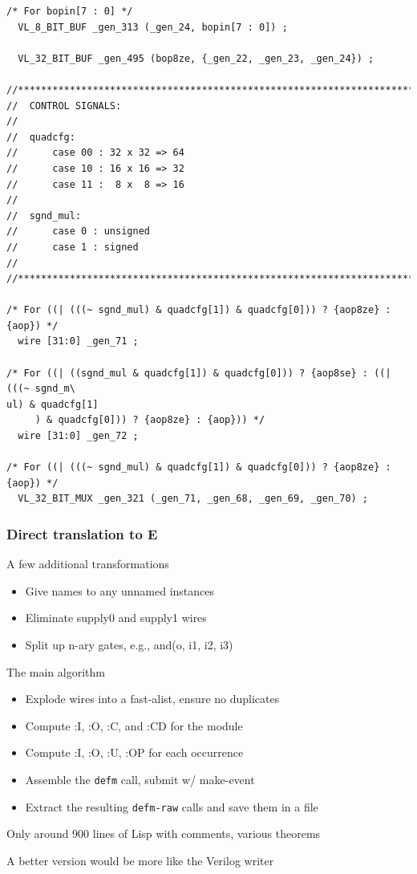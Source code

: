 \documentclass[mathserif]{beamer}
\begin{document}
\begin{frame}[fragile]

{\tiny
\begin{verbatim}
/* For bopin[7 : 0] */
  VL_8_BIT_BUF _gen_313 (_gen_24, bopin[7 : 0]) ;

  VL_32_BIT_BUF _gen_495 (bop8ze, {_gen_22, _gen_23, _gen_24}) ;

//************************************************************************
//  CONTROL SIGNALS:
//
//  quadcfg:
//      case 00 : 32 x 32 => 64
//      case 10 : 16 x 16 => 32
//      case 11 :  8 x  8 => 16
//
//  sgnd_mul:
//      case 0 : unsigned
//      case 1 : signed
//
//************************************************************************

/* For ((| (((~ sgnd_mul) & quadcfg[1]) & quadcfg[0])) ? {aop8ze} : {aop}) */
  wire [31:0] _gen_71 ;

/* For ((| ((sgnd_mul & quadcfg[1]) & quadcfg[0])) ? {aop8se} : ((| (((~ sgnd_m\
ul) & quadcfg[1]
     ) & quadcfg[0])) ? {aop8ze} : {aop})) */
  wire [31:0] _gen_72 ;

/* For ((| (((~ sgnd_mul) & quadcfg[1]) & quadcfg[0])) ? {aop8ze} : {aop}) */
  VL_32_BIT_MUX _gen_321 (_gen_71, _gen_68, _gen_69, _gen_70) ;

\end{verbatim}
}
\end{frame}


\begin{frame}
\frametitle{Direct translation to E}

A few additional transformations
\begin{itemize}
\item Give names to any unnamed instances
\item Eliminate supply0 and supply1 wires
\item Split up n-ary gates, e.g., and(o, i1, i2, i3)
\end{itemize}

\bigskip
The main algorithm
\begin{itemize}
\item Explode wires into a fast-alist, ensure no duplicates
\item Compute :I, :O, :C, and :CD for the module
\item Compute :I, :O, :U, :OP for each occurrence
\item Assemble the {\tt defm} call, submit w/ make-event
\item Extract the resulting {\tt defm-raw} calls and save them in a file
\end{itemize}

\bigskip
Only around 900 lines of Lisp with comments, various theorems

A better version would be more like the Verilog writer

\end{frame}
\end{document}
